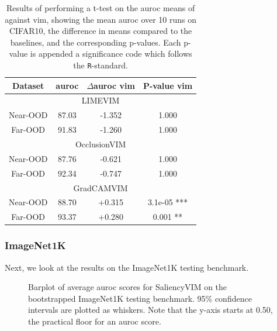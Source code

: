 \documentclass[UKenglish]{uiomasterthesis} %
\theoremstyle{definition}
\begin{document}
\begin{table}[H]
\setlength\tabcolsep{3pt}
\begin{center}
\begin{tabular}{ |c|c|c|c| }
    \hline
    Dataset & \ac{auroc} & $\Delta$\ac{auroc} \ac{vim} & P-value \ac{vim} \\
    \hline
    \hline
    \multicolumn{4}{|c|}{LIMEVIM} \\
    \hline
    \rowcolor{near!50}
    Near-OOD & 87.03 & -1.352 & 1.000 \\
    \rowcolor{far!50}
    Far-OOD & 91.83 & -1.260 & 1.000 \\
    \hline
    \hline
    \multicolumn{4}{|c|}{OcclusionVIM} \\
    \hline
    \rowcolor{near!50}
    Near-OOD & 87.76 & -0.621 & 1.000 \\
    \rowcolor{far!50}
    Far-OOD & 92.34 & -0.747 & 1.000 \\
    \hline
    \hline
    \multicolumn{4}{|c|}{GradCAMVIM} \\
    \hline
    \rowcolor{near!50}
    Near-OOD & 88.70 & +0.315 & 3.1e-05 *** \\
    \rowcolor{far!50}
    Far-OOD & 93.37 & +0.280 & 0.001 ** \\
    \hline
    \end{tabular}
    \caption[]{Results of performing a t-test on the \ac{auroc} means of against \ac{vim}, showing the mean \ac{auroc} over 10 runs on CIFAR10, the difference in means compared to the baselines, and the corresponding p-values. Each p-value is appended a significance code which follows the \texttt{R}-standard.}
    \label{table:cifar10_salvim_ttest}
\end{center}
\setlength\tabcolsep{6pt}
\end{table}

\subsubsection{ImageNet1K}

Next, we look at the results on the ImageNet1K testing benchmark.

\begin{figure}[H]
    \begin{center}
        
    \end{center}
    \caption[ImageNet1K SaliencyVIM Bootstrap]{Barplot of average \ac{auroc} scores for SaliencyVIM on the bootstrapped ImageNet1K testing benchmark. 95\% confidence intervals are plotted as whiskers. Note that the y-axis starts at 0.50, the practical floor for an \ac{auroc} score.}
    \label{fig:imagenet_salvim_bootstrap_barplot}
\end{figure}
\end{document}
